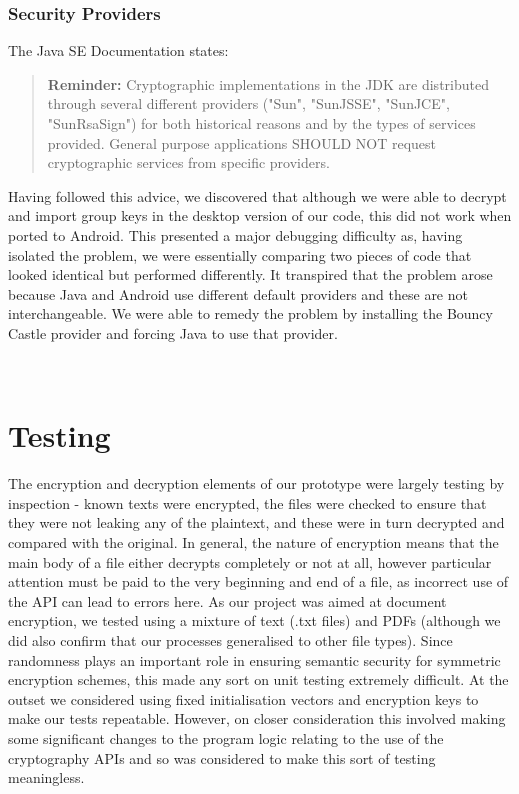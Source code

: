\subsubsection*{Security Providers}
The Java SE Documentation states:
\begin{quotation}
\textbf{Reminder: }Cryptographic implementations in the JDK are distributed through several different providers ("Sun", "SunJSSE", "SunJCE", "SunRsaSign") for both historical reasons and by the types of services provided. General purpose applications SHOULD NOT request cryptographic services from specific providers. \citep{javasedoc}
\end{quotation} 
Having followed this advice, we discovered that although we were able to decrypt and import group keys in the desktop version of our code, this did not work when ported to Android.  This presented a major debugging difficulty as, having isolated the problem, we were essentially comparing two pieces of code that looked identical but performed differently.  It transpired that the problem arose because Java and Android use different default providers and these are not interchangeable.  We were able to remedy the problem by installing the Bouncy Castle provider and forcing Java to use that provider.

\\




\section{Testing}

The encryption and decryption elements of our prototype were largely testing by inspection - known texts were encrypted, the files were checked to ensure that they were not leaking any of the plaintext, and these were in turn decrypted and compared with the original.   In general, the nature of encryption means that the main body of a file either decrypts completely or not at all, however particular attention must be paid to the very beginning and end of a file, as incorrect use of the API can lead to errors here.  As our project was aimed at document encryption, we tested using a mixture of text (.txt files) and PDFs (although we did also confirm that our processes generalised to other file types).  Since randomness plays an important role in ensuring  semantic security  for symmetric encryption schemes, this made any sort on unit testing extremely difficult.  At the outset we considered using fixed initialisation vectors and encryption keys to make our tests repeatable.  However, on closer consideration this involved making some significant changes to the program logic relating to the use of the cryptography APIs and so was considered to make this sort of testing meaningless.  

